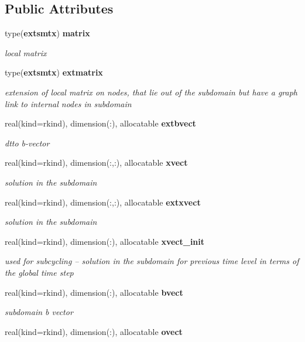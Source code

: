 \subsection*{Public Attributes}
\begin{DoxyCompactItemize}
\item 
type({\bf extsmtx}) {\bf matrix}
\begin{DoxyCompactList}\small\item\em local matrix \end{DoxyCompactList}\item 
type({\bf extsmtx}) {\bf extmatrix}
\begin{DoxyCompactList}\small\item\em extension of local matrix on nodes, that lie out of the subdomain but have a graph link to internal nodes in subdomain \end{DoxyCompactList}\item 
real(kind=rkind), dimension(\+:), allocatable {\bf extbvect}
\begin{DoxyCompactList}\small\item\em dtto b-\/vector \end{DoxyCompactList}\item 
real(kind=rkind), dimension(\+:,\+:), allocatable {\bf xvect}
\begin{DoxyCompactList}\small\item\em solution in the subdomain \end{DoxyCompactList}\item 
real(kind=rkind), dimension(\+:,\+:), allocatable {\bf extxvect}
\begin{DoxyCompactList}\small\item\em solution in the subdomain \end{DoxyCompactList}\item 
real(kind=rkind), dimension(\+:), allocatable {\bf xvect\+\_\+init}
\begin{DoxyCompactList}\small\item\em used for subcycling -- solution in the subdomain for previous time level in terms of the global time step \end{DoxyCompactList}\item 
real(kind=rkind), dimension(\+:), allocatable {\bf bvect}
\begin{DoxyCompactList}\small\item\em subdomain b vector \end{DoxyCompactList}\item 
real(kind=rkind), dimension(\+:), allocatable {\bf ovect}

\end{DoxyCompactItemize}
